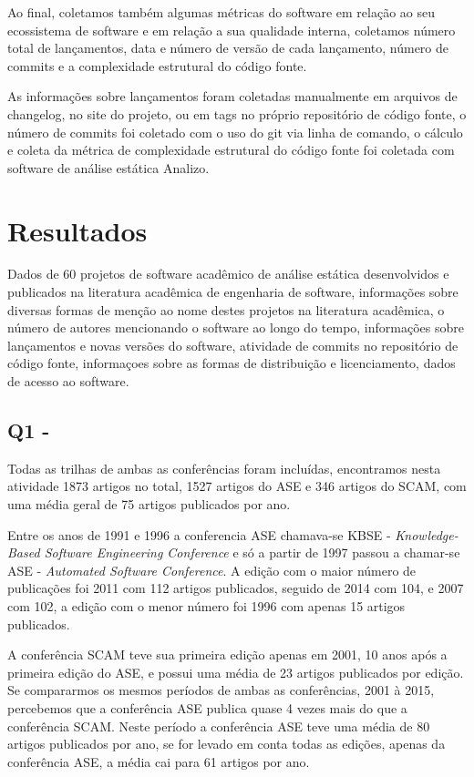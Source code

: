 Ao final, coletamos também algumas métricas do software em relação ao seu
ecossistema de software e em relação a sua qualidade interna, coletamos número
total de lançamentos, data e número de versão de cada lançamento, número de
commits e a complexidade estrutural do código fonte.

As informações sobre lançamentos foram coletadas manualmente em arquivos de
changelog, no site do projeto, ou em tags no próprio repositório de código
fonte, o número de commits foi coletado com o uso do git via linha de comando,
o cálculo e coleta da métrica de complexidade estrutural do código fonte foi
coletada com software de análise estática Analizo.

\section{Resultados} %

Dados de 60 projetos de software acadêmico de análise estática desenvolvidos e
publicados na literatura acadêmica de engenharia de software, informações sobre
diversas formas de menção ao nome destes projetos na literatura acadêmica,
o número de autores mencionando o software ao longo do tempo, informações sobre
lançamentos e novas versões do software, atividade de commits no repositório
de código fonte, informaçoes sobre as formas de distribuição e licenciamento,
dados de acesso ao software.

\subsection{Q1 - \QuestaoUm}

Todas as trilhas de ambas as conferências foram incluídas,
encontramos nesta atividade 1873 artigos no total, 1527 artigos do ASE e 346
artigos do SCAM, com uma média geral de 75 artigos publicados por ano. 

Entre os anos de 1991 e 1996 a conferencia ASE chamava-se KBSE - {\it
Knowledge-Based Software Engineering Conference} e só a partir de 1997 passou a
chamar-se ASE - {\it Automated Software Conference}. A edição com o maior
número de publicações foi 2011 com 112 artigos publicados, seguido de 2014 com
104, e 2007 com 102, a edição com o menor número foi 1996 com apenas 15 artigos
publicados.

A conferência SCAM teve sua primeira edição apenas em 2001, 10 anos após a
primeira edição do ASE, e possui uma média de 23 artigos publicados por edição.
Se compararmos os mesmos períodos de ambas as conferências, 2001 à 2015,
percebemos que a conferência ASE publica quase 4 vezes mais do que a
conferência SCAM. Neste período a conferência ASE teve uma média de 80 artigos
publicados por ano, se for levado em conta todas as edições, apenas da
conferência ASE, a média cai para 61 artigos por ano.

